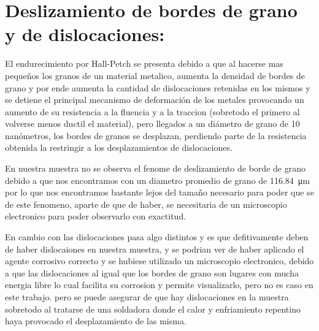 \documentclass[12pt,a4paper]{article}
\begin{document}
\section{Deslizamiento de bordes de grano y de dislocaciones: }

El endurecimiento por Hall-Petch se presenta debido a que al hacerse mas pequeños los granos de un material metalico, aumenta la densidad de bordes de grano y por ende aumenta la cantidad de dislocaciones retenidas en los mismos y se detiene el principal mecanismo de deformación de los metales provocando un aumento de su resistencia a la fluencia y a la traccion (sobretodo el primero al volverse menos ductil el material), pero llegados a un diámetro de grano de 10 nanómetros, los bordes de granos se desplazan, perdiendo parte de la resistencia obtenida la restringir a los desplazamientos de dislocaciones.

En nuestra muestra no se observa el fenome de deslizamiento de borde de grano debido a que nos encontramos con un diametro promedio de grano de \SI{116,84}{\micro\metre} por lo que nos encontramos bastante lejos del tamaño necesario para poder que se de este fenomeno, aparte de que de haber, se necesitaria de un microscopio electronico para poder observarlo con exactitud.

En cambio con las dislocaciones pasa algo distintos y es que defitivamente deben de haber dislocaiones en nuestra muestra, y se podrian ver de haber aplicado el agente corrosivo correcto y se hubiese utilizado un microscopio electronico, debido a que las dislocaciones al igual que los bordes de grano son lugares con mucha energia libre lo cual facilita su corrosion y permite visualizarlo, pero no es caso en este trabajo.
pero se puede asegurar de que hay dislocaciones en la muestra sobretodo al tratarse de una soldadora donde el calor y enfriamiento repentino haya provocado el desplazamiento de las misma.
\end{document}
